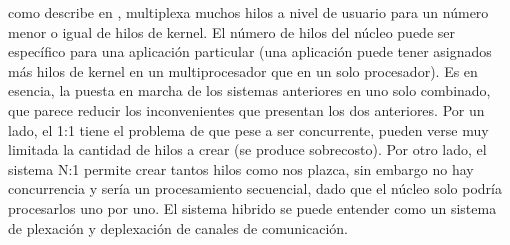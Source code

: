 \documentclass[12pt]{article}
\begin{document}
\begin{multicols}{2}
 \indent como describe en \cite{Sil}, multiplexa muchos hilos a nivel de usuario para un número menor o igual de hilos de kernel. El número de hilos del núcleo puede ser específico para una aplicación particular (una aplicación puede tener asignados más hilos de kernel en un multiprocesador que en un solo procesador). Es en esencia, la puesta en marcha de los sistemas anteriores en uno solo combinado, que parece reducir los inconvenientes que presentan los dos anteriores. Por un lado, el 1:1 tiene el problema de que pese a ser concurrente, pueden verse muy limitada la cantidad de hilos a crear (se produce sobrecosto). Por otro lado, el sistema N:1 permite crear tantos hilos como nos plazca, sin embargo no hay concurrencia y sería un procesamiento secuencial, dado que el núcleo solo podría procesarlos uno por uno. El sistema hibrido se puede entender como un sistema de plexación y deplexación de canales de comunicación.

\end{multicols}
\end{document}
